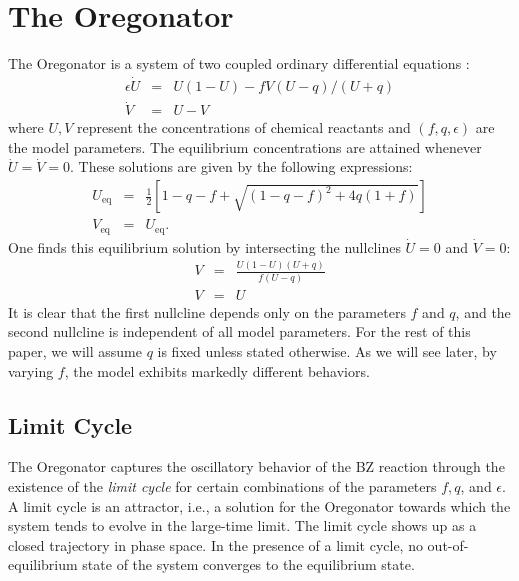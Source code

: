 \documentclass[twocolumn,amsmath,amssymb,aps]{revtex4}
\begin{document}
\section{The Oregonator}
The Oregonator is a system of two coupled ordinary differential equations \cite{doi:10.1063/1.1681288}:
\begin{eqnarray*}
\epsilon \dot{U} &=& U(1-U) - fV(U-q)/(U+q) \\
\dot{V} &=&  U-V
\end{eqnarray*}
where $U,V$ represent the concentrations of chemical reactants and $(f,q,\epsilon)$ are the model parameters. The equilibrium concentrations are attained whenever $\dot{U} = \dot{V} = 0$. These solutions are given by the following expressions:
\begin{eqnarray*}
U_{\text{eq}} &=& \frac{1}{2}\left[1-q-f + \sqrt{(1-q-f)^2 + 4q(1+f)}\right]\nonumber \\ 
V_{\text{eq}} &=& U_{\text{eq}}. 
\end{eqnarray*}
One finds this equilibrium solution by intersecting the nullclines $\dot{U} = 0$ and $\dot{V} = 0$:
\begin{eqnarray*} 
V &=& \frac{U(1-U)(U+q)}{f(U-q)}\\
V &=&U 
\end{eqnarray*}
It is clear that the first nullcline depends only on the parameters $f$ and $q$, and the second nullcline is independent of all model parameters. For the rest of this paper, we will assume $q$ is fixed unless stated otherwise. As we will see later, by varying $f$, the model exhibits markedly different behaviors. 

\subsection{Limit Cycle}
The Oregonator captures the oscillatory behavior of the BZ reaction through the existence of the \textit{limit cycle} for certain combinations of the parameters $f,q$, and $\epsilon$. A limit cycle is an attractor, i.e., a solution for the Oregonator towards which the system tends to evolve in the large-time limit. The limit cycle shows up as a closed trajectory in phase space. In the presence of a limit cycle, no out-of-equilibrium state of the system converges to the equilibrium state.
\end{document}
